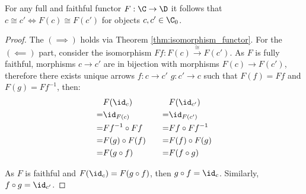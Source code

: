 \begin{theorem}\label{thm:full_faithful_isomorphism}

  For any full and faithful functor $F:\C\to \D$ it follows that $c \cong c'
  \iff F(c) \cong F(c')$ for objects $c, c'\in \C_0$.

  \begin{proof}
    The $(\implies)$ holds via Theorem \ref{thm:isomorphism_functor}. For the
    $(\impliedby)$ part, consider the isomorphism $Ff: F(c) \overset{\cong}{\to}
    F(c')$. As $F$ is fully faithful, morphisms $c\to c'$ are in bijection
    with morphisms $F(c)\to F(c')$, therefore there exists unique arrows $f:c\to c'$ $g:c'\to c$ such that $F(f) = Ff$ and $F(g) = Ff^{-1}$, then:
    \[
      \begin{aligned}
        &F(\id_c)\\
        =& \id_{F(c)}\\
        =& Ff^{-1} \circ Ff\\
        =& F(g) \circ F(f)\\
        =& F(g\circ f)
      \end{aligned}
      \qquad
      \begin{aligned}
        &F(\id_{c'})\\
        =& \id_{F(c')}\\
        =& Ff \circ Ff^{-1}\\
        =& F(f) \circ F(g)\\
        =& F(f\circ g)
      \end{aligned}
    \]

    As $F$ is faithful and $F(\id_c) = F(g\circ f)$, then $g\circ f = \id_c$.
    Similarly, $f\circ g = \id_{c'}$.
  \end{proof}
\end{theorem}